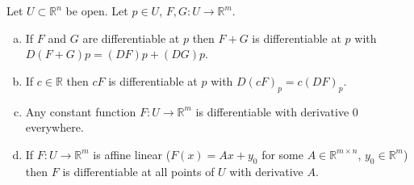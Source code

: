 \begin{proposition}\label{ra.sum.scal.diff.mult.diff}
 
 Let \(U \subset \mathbb{R}^n\) be open. Let \(p \in U\), \(F, G : U \to \mathbb{R}^m\).
 
 \begin{enumerate}[(a)]
 
 \item If \(F\) and \(G\) are differentiable at \(p\) then \(F+G\) is differentiable at \(p\) with \(D(F+G)p = (DF)p + (DG)p\).
 
 \item If \(c \in \mathbb{R}\) then \(cF\) is differentiable at \(p\) with \(D(cF)_p = c (DF)_p\).
 
 \item Any constant function \(F: U \to \mathbb{R}^m\) is differentiable with derivative 0 everywhere.
 
 \item If \(F:U \to \mathbb{R}^m\) is affine linear (\(F(x) = Ax + y_0\) for some \(A \in \mathbb{R}^{m \times n}\), \(y_0 \in \mathbb{R}^m\)) then \(F\) is differentiable at all points of \(U\) with derivative \(A\).
 
 \end{enumerate}
 
 \end{proposition}
 
